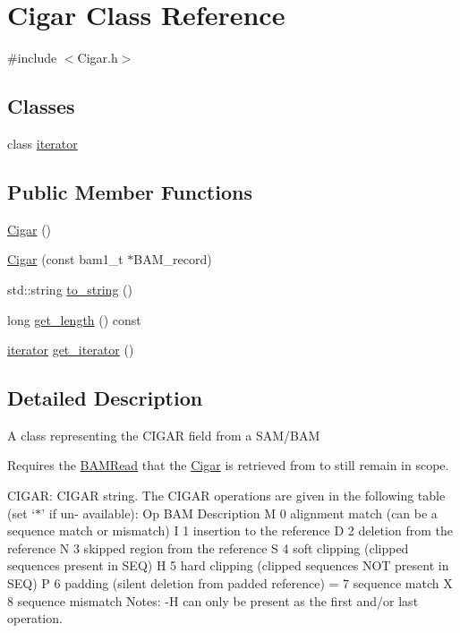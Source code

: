\hypertarget{class_cigar}{
\section{Cigar Class Reference}
\label{class_cigar}
}


{\ttfamily \#include $<$Cigar.h$>$}

\subsection*{Classes}
\begin{DoxyCompactItemize}
\item 
class \hyperlink{class_cigar_1_1iterator}{iterator}
\end{DoxyCompactItemize}
\subsection*{Public Member Functions}
\begin{DoxyCompactItemize}
\item 
\hyperlink{class_cigar_a2571db4ce2a919c396678fbb56a0fd6d}{Cigar} ()
\item 
\hyperlink{class_cigar_a3e62c7013ade6aa475c2187a760d00ad}{Cigar} (const bam1\_\-t $\ast$BAM\_\-record)
\item 
std::string \hyperlink{class_cigar_a479d41ab253dab1e6c3ebf82ed1c4f0c}{to\_\-string} ()
\item 
long \hyperlink{class_cigar_a739bd187b321432f023239608c0205fb}{get\_\-length} () const 
\item 
\hyperlink{class_cigar_1_1iterator}{iterator} \hyperlink{class_cigar_a3bb0c635eb4a28ae3c1985845bac06a5}{get\_\-iterator} ()
\end{DoxyCompactItemize}


\subsection{Detailed Description}
A class representing the CIGAR field from a SAM/BAM

Requires the \hyperlink{class_b_a_m_read}{BAMRead} that the \hyperlink{class_cigar}{Cigar} is retrieved from to still remain in scope.

CIGAR: CIGAR string. The CIGAR operations are given in the following table (set `$\ast$' if un-\/ available): Op BAM Description M 0 alignment match (can be a sequence match or mismatch) I 1 insertion to the reference D 2 deletion from the reference N 3 skipped region from the reference S 4 soft clipping (clipped sequences present in SEQ) H 5 hard clipping (clipped sequences NOT present in SEQ) P 6 padding (silent deletion from padded reference) = 7 sequence match X 8 sequence mismatch Notes: -\/H can only be present as the first and/or last operation.

